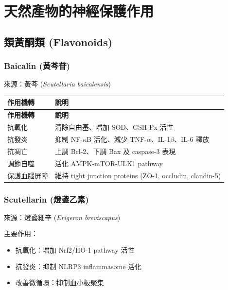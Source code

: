 \documentclass[12pt,a4paper]{article}
\begin{document}
\section{天然產物的神經保護作用}

\subsection{類黃酮類 (Flavonoids)}

\subsubsection{Baicalin (黃芩苷)}

來源：黃芩 (\textit{Scutellaria baicalensis})

\begin{longtable}{p{4cm}p{10cm}}
\toprule
\textbf{作用機轉} & \textbf{說明} \\
\midrule
\endfirsthead
\toprule
\textbf{作用機轉} & \textbf{說明} \\
\midrule
\endhead
\bottomrule
\endfoot

抗氧化 & 清除自由基、增加 SOD、GSH-Px 活性 \\
\midrule
抗發炎 & 抑制 NF-$\kappa$B 活化、減少 TNF-$\alpha$、IL-1$\beta$、IL-6 釋放 \\
\midrule
抗凋亡 & 上調 Bcl-2、下調 Bax 及 caspase-3 表現 \\
\midrule
調節自噬 & 活化 AMPK-mTOR-ULK1 pathway \\
\midrule
保護血腦屏障 & 維持 tight junction proteins (ZO-1, occludin, claudin-5) \\
\bottomrule
\end{longtable}

\subsubsection{Scutellarin (燈盞乙素)}

來源：燈盞細辛 (\textit{Erigeron breviscapus})

主要作用：
\begin{itemize}
    \item 抗氧化：增加 Nrf2/HO-1 pathway 活性
    \item 抗發炎：抑制 NLRP3 inflammasome 活化
    \item 改善微循環：抑制血小板聚集
\end{itemize}
\end{document}

